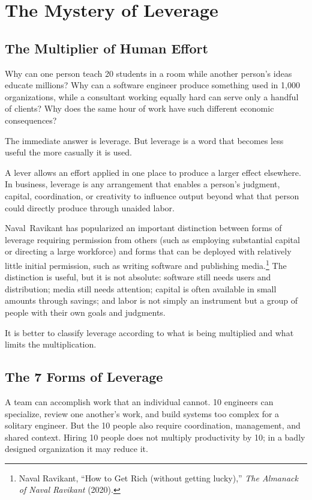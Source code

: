 \section{The Mystery of Leverage}

\subsection{The Multiplier of Human Effort}

Why can one person teach 20 students in a room while another person's ideas educate millions? Why can a software engineer produce something used in 1,000 organizations, while a consultant working equally hard can serve only a handful of clients? Why does the same hour of work have such different economic consequences?

The immediate answer is leverage. But leverage is a word that becomes less useful the more casually it is used.

A lever allows an effort applied in one place to produce a larger effect elsewhere. In business, leverage is any arrangement that enables a person's judgment, capital, coordination, or creativity to influence output beyond what that person could directly produce through unaided labor.

Naval~Ravikant has popularized an important distinction between forms of leverage requiring permission from others (such as employing substantial capital or directing a large workforce) and forms that can be deployed with relatively little initial permission, such as writing software and publishing media.\footnote{Naval Ravikant, ``How to Get Rich (without getting lucky),'' \textit{The Almanack of Naval Ravikant} (2020).} The distinction is useful, but it is not absolute: software still needs users and distribution; media still needs attention; capital is often available in small amounts through savings; and labor is not simply an instrument but a group of people with their own goals and judgments.

It is better to classify leverage according to what is being multiplied and what limits the multiplication.

\subsection{The 7 Forms of Leverage}

\par\vspace{1pt}
A team can accomplish work that an individual cannot. 10 engineers can specialize, review one another's work, and build systems too complex for a solitary engineer. But the 10 people also require coordination, management, and shared context. Hiring 10 people does not multiply productivity by 10; in a badly designed organization it may reduce it.
\vspace{3.5pt}

